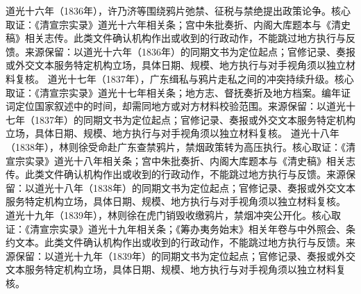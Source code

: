 道光十六年（1836年），许乃济等围绕鸦片弛禁、征税与禁绝提出政策论争。核心取证：《清宣宗实录》道光十六年相关条；宫中朱批奏折、内阁大库题本与《清史稿》相关志传。此类文件确认机构作出或收到的行政动作，不能跳过地方执行与反馈。来源保留：以道光十六年（1836年）的同期文书为定位起点；官修记录、奏报或外交文本服务特定机构立场，具体日期、规模、地方执行与对手视角须以独立材料复核。
道光十七年（1837年），广东缉私与鸦片走私之间的冲突持续升级。核心取证：《清宣宗实录》道光十七年相关条；地方志、督抚奏折及地方档案。编年证词定位国家叙述中的时间，却需同地方或对方材料校验范围。来源保留：以道光十七年（1837年）的同期文书为定位起点；官修记录、奏报或外交文本服务特定机构立场，具体日期、规模、地方执行与对手视角须以独立材料复核。
道光十八年（1838年），林则徐受命赴广东查禁鸦片，禁烟政策转为高压执行。核心取证：《清宣宗实录》道光十八年相关条；宫中朱批奏折、内阁大库题本与《清史稿》相关志传。此类文件确认机构作出或收到的行政动作，不能跳过地方执行与反馈。来源保留：以道光十八年（1838年）的同期文书为定位起点；官修记录、奏报或外交文本服务特定机构立场，具体日期、规模、地方执行与对手视角须以独立材料复核。
道光十九年（1839年），林则徐在虎门销毁收缴鸦片，禁烟冲突公开化。核心取证：《清宣宗实录》道光十九年相关条；《筹办夷务始末》相关年卷与中外照会、条约文本。此类文件确认机构作出或收到的行政动作，不能跳过地方执行与反馈。来源保留：以道光十九年（1839年）的同期文书为定位起点；官修记录、奏报或外交文本服务特定机构立场，具体日期、规模、地方执行与对手视角须以独立材料复核。
